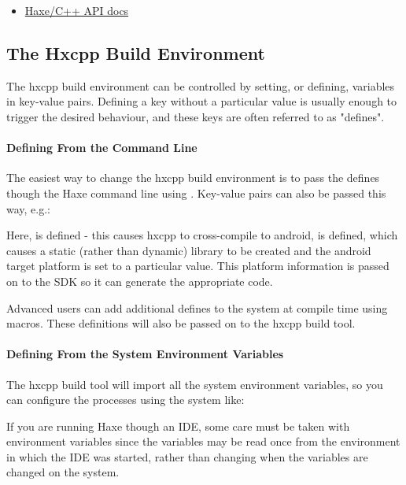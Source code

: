 \begin{itemize}
	\item \href{https://api.haxe.org/cpp/}{Haxe/C++ API docs}
\end{itemize}

\subsection{The Hxcpp Build Environment}
\label{target-cpp-build-environment}
The hxcpp build environment can be controlled by setting, or defining, variables in key-value pairs. Defining a key without a particular value is usually enough to trigger the desired behaviour, and these keys are often referred to as "defines".

\paragraph{Defining From the Command Line}
The easiest way to change the hxcpp build environment is to pass the defines though the Haxe command line using .  Key-value pairs can also be passed this way, e.g.:


Here,  is defined - this causes hxcpp to cross-compile to android,  is defined, which causes a static (rather than dynamic) library to be created and the android target platform is set to a particular value.  This platform information is passed on to the SDK so it can generate the appropriate code.

Advanced users can add additional defines to the system at compile time using macros.  These definitions will also be passed on to the hxcpp build tool.

\paragraph{Defining From the System Environment Variables}
The hxcpp build tool will import all the system environment variables, so you can configure the processes using the system like:


If you are running Haxe though an IDE, some care must be taken with environment variables since the variables may be read once from the environment in which the IDE was started, rather than changing when the variables are changed on the system.

